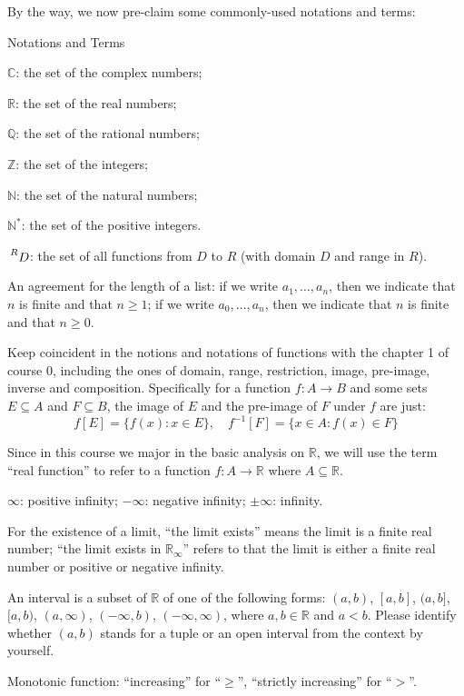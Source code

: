 \documentclass{article}
\begin{document}
By the way, we now pre-claim some commonly-used notations and terms:
\begin{Df}{Notations and Terms}
    \begin{compactenum}
    \item $\mathbb{C}$: the set of the complex numbers;
    \item $\mathbb{R}$: the set of the real numbers;
    \item $\mathbb{Q}$: the set of the rational numbers;
    \item $\mathbb{Z}$: the set of the integers;
    \item $\mathbb{N}$: the set of the natural numbers;
    \item $\mathbb{N^\ast}$: the set of the positive integers.
    \item $\sideset{^R}{}{\mathop{D}}$: the set of all functions from $D$ to $R$ (with domain $D$ and range in $R$).
    \item An agreement for the length of a list: if we write $a_1, \dots, a_n$, then we indicate that $n$ is finite and that $n\geq 1$; if we write $a_0, \dots, a_n$, then we indicate that $n$ is finite and that $n\geq 0$.
    \item Keep coincident in the notions and notations of functions with the chapter 1 of course 0, including the ones of domain, range, restriction, image, pre-image, inverse and composition. Specifically for a function $f: A\rightarrow B$ and some sets $E\subseteq A$ and $F\subseteq B$, the image of $E$ and the pre-image of $F$ under $f$ are just:
    $$f[E] = \{f(x): x\in E\},\quad f^{-1}[F] = \{x\in A: f(x)\in F\}$$
    \item Since in this course we major in the basic analysis on $\mathbb{R}$, we will use the term ``real function'' to refer to a function $f: A\rightarrow \mathbb{R}$ where $A\subseteq \mathbb{R}$.
    \item $\infty$: positive infinity; $-\infty$: negative infinity; $\pm\infty$: infinity.
    \item For the existence of a limit, ``the limit exists'' means the limit is a finite real number; ``the limit exists in $\mathbb{R}_\infty$'' refers to that the limit is either a finite real number or positive or negative infinity.
    \item An interval is a subset of $\mathbb{R}$ of one of the following forms: $(a,b)$, $[a,b]$, $(a,b]$, $[a,b)$, $(a, \infty)$, $(-\infty, b)$, $(-\infty, \infty)$, where $a, b\in\mathbb{R}$ and $a<b$. Please identify whether $(a,b)$ stands for a tuple or an open interval from the context by yourself.
    \item Monotonic function: ``increasing'' for ``$\geq$'', ``strictly increasing'' for ``$>$''.
\end{compactenum} 
\end{Df}
\end{document}
